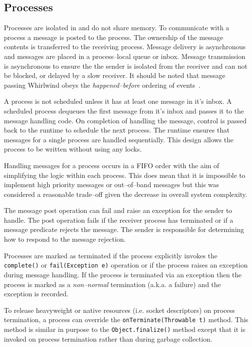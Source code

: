 \documentclass[conference]{IEEEtran}
\begin{document}
\subsection{Processes}
\label{section:Processes}

Processes are isolated in and do not share memory. To communicate with a process a message is posted to the process. The ownership of the message contents is transferred to the receiving process. Message delivery is asynchronous and messages are placed in a process--local queue or inbox. Message transmission is asynchronous to ensure the the sender is isolated from the receiver and can not be blocked, or delayed by a slow receiver. It should be noted that message passing Whirlwind obeys the \emph{happened--before} ordering of events~\cite{lamport78}.

A process is not scheduled unless it has at least one message in it's inbox. A scheduled process dequeues the first message from it's inbox and passes it to the message handling code. On completion of handling the message, control is passed back to the runtime to schedule the next process. The runtime ensures that messages for a single process are handled sequentially. This design allows the process to be written without using any locks.


Handling messages for a process occurs in a FIFO order with the aim of simplifying the logic within each process. This does mean that it is impossible to implement high priority messages or out--of--band messages but this was considered a reasonable trade--off given the decrease in overall system complexity.

The message post operation can fail and raise an exception for the sender to handle. The post operation fails if the receiver process has terminated or if a message predicate rejects the message. The sender is responsible for determining how to respond to the message rejection.

Processes are marked as terminated if the process explicitly invokes the \verb+complete()+ or \verb+fail(Exception e)+ operation or if the process raises an exception during message handling. If the process is terminated via an exception then the process is marked as a \emph{non--normal} termination (a.k.a. a failure) and the exception is recorded. 

To release heavyweight or native resources (i.e. socket descriptors) on process termination, a process can override the \verb+onTerminate(Throwable t)+ method. This method is similar in purpose to the \verb+Object.finalize()+ method except that it is invoked on process termination rather than during garbage collection. 
\end{document}
